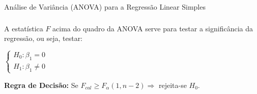 \documentclass[14pt,aspectratio=1610]{beamer}
\begin{document}
\begin{frame}{Análise de Variância (ANOVA) para a Regressão Linear Simples}
\frametitle{}
\begin{block}{}
A estatística $F$ acima do quadro da ANOVA serve para testar a significância da regressão, ou seja, testar:
\begin{center}
$
\begin{cases}
       H_{0}:\beta_{1}=0\\ 
       H_{1}:\beta_{1}\neq 0
\end{cases}
$
\end{center}
\textbf{Regra de Decisão:} Se $F_{cal}\geq F_{\alpha}(1,n-2)\Rightarrow$ rejeita-se $H_{0}.$
\end{block}
\nocite{Morettin09, Apostila, eric, montgomery2016, Bastos2025}
\end{frame}


\begin{frame}[allowframebreaks]
\frametitle{}
\printbibliography
\end{frame}
\end{document}
